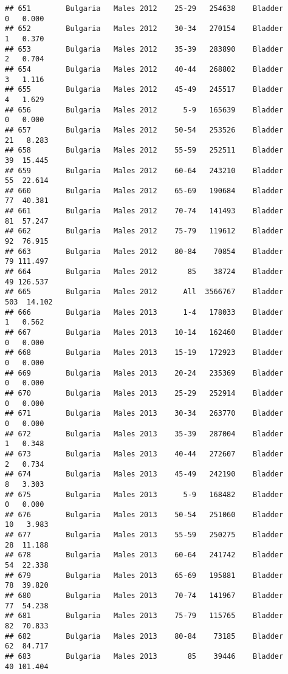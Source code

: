 \documentclass[
]{article}
\begin{document}
\begin{verbatim}
## 651        Bulgaria   Males 2012    25-29   254638    Bladder      0   0.000
## 652        Bulgaria   Males 2012    30-34   270154    Bladder      1   0.370
## 653        Bulgaria   Males 2012    35-39   283890    Bladder      2   0.704
## 654        Bulgaria   Males 2012    40-44   268802    Bladder      3   1.116
## 655        Bulgaria   Males 2012    45-49   245517    Bladder      4   1.629
## 656        Bulgaria   Males 2012      5-9   165639    Bladder      0   0.000
## 657        Bulgaria   Males 2012    50-54   253526    Bladder     21   8.283
## 658        Bulgaria   Males 2012    55-59   252511    Bladder     39  15.445
## 659        Bulgaria   Males 2012    60-64   243210    Bladder     55  22.614
## 660        Bulgaria   Males 2012    65-69   190684    Bladder     77  40.381
## 661        Bulgaria   Males 2012    70-74   141493    Bladder     81  57.247
## 662        Bulgaria   Males 2012    75-79   119612    Bladder     92  76.915
## 663        Bulgaria   Males 2012    80-84    70854    Bladder     79 111.497
## 664        Bulgaria   Males 2012       85    38724    Bladder     49 126.537
## 665        Bulgaria   Males 2012      All  3566767    Bladder    503  14.102
## 666        Bulgaria   Males 2013      1-4   178033    Bladder      1   0.562
## 667        Bulgaria   Males 2013    10-14   162460    Bladder      0   0.000
## 668        Bulgaria   Males 2013    15-19   172923    Bladder      0   0.000
## 669        Bulgaria   Males 2013    20-24   235369    Bladder      0   0.000
## 670        Bulgaria   Males 2013    25-29   252914    Bladder      0   0.000
## 671        Bulgaria   Males 2013    30-34   263770    Bladder      0   0.000
## 672        Bulgaria   Males 2013    35-39   287004    Bladder      1   0.348
## 673        Bulgaria   Males 2013    40-44   272607    Bladder      2   0.734
## 674        Bulgaria   Males 2013    45-49   242190    Bladder      8   3.303
## 675        Bulgaria   Males 2013      5-9   168482    Bladder      0   0.000
## 676        Bulgaria   Males 2013    50-54   251060    Bladder     10   3.983
## 677        Bulgaria   Males 2013    55-59   250275    Bladder     28  11.188
## 678        Bulgaria   Males 2013    60-64   241742    Bladder     54  22.338
## 679        Bulgaria   Males 2013    65-69   195881    Bladder     78  39.820
## 680        Bulgaria   Males 2013    70-74   141967    Bladder     77  54.238
## 681        Bulgaria   Males 2013    75-79   115765    Bladder     82  70.833
## 682        Bulgaria   Males 2013    80-84    73185    Bladder     62  84.717
## 683        Bulgaria   Males 2013       85    39446    Bladder     40 101.404

\end{verbatim}
\end{document}
